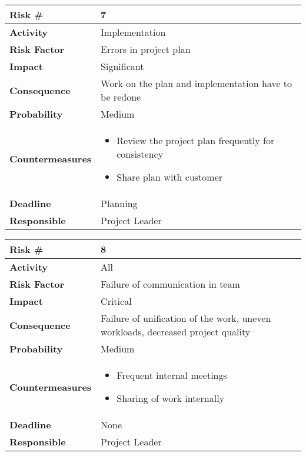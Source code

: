 \begin{tabularx}{\textwidth}{ | l | X | }
\hline
\textbf{Risk \#} & 7 \\ \hline
\textbf{Activity} & Implementation \\ \hline
\textbf{Risk Factor} & Errors in project plan \\ \hline
\textbf{Impact} & Significant \\ \hline
\textbf{Consequence} & Work on the plan and implementation have to be redone  \\ \hline
\textbf{Probability} & Medium \\ \hline
\textbf{Countermeasures} & \begin{itemize}
  \item Review the project plan frequently for consistency
  \item Share plan with customer
\end{itemize}  \\ \hline
\textbf{Deadline} &  Planning \\ \hline
\textbf{Responsible} & Project Leader \\ \hline
\end{tabularx}

\begin{tabularx}{\textwidth}{ | l | X | }
\hline
\textbf{Risk \#} & 8 \\ \hline
\textbf{Activity} & All \\ \hline
\textbf{Risk Factor} & Failure of communication in team \\ \hline
\textbf{Impact} & Critical \\ \hline
\textbf{Consequence} & Failure of unification of the work, uneven workloads, decreased project quality  \\ \hline
\textbf{Probability} & Medium \\ \hline
\textbf{Countermeasures} & \begin{itemize}
  \item Frequent internal meetings
  \item Sharing of work internally
\end{itemize}  \\ \hline
\textbf{Deadline} &  None \\ \hline
\textbf{Responsible} & Project Leader \\ \hline
\end{tabularx}

